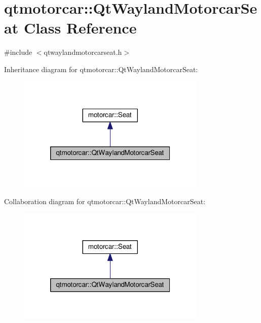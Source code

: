 \hypertarget{classqtmotorcar_1_1QtWaylandMotorcarSeat}{\section{qtmotorcar\-:\-:Qt\-Wayland\-Motorcar\-Seat Class Reference}
\label{classqtmotorcar_1_1QtWaylandMotorcarSeat}
}


{\ttfamily \#include $<$qtwaylandmotorcarseat.\-h$>$}



Inheritance diagram for qtmotorcar\-:\-:Qt\-Wayland\-Motorcar\-Seat\-:
\nopagebreak
\begin{figure}[H]
\begin{center}
\leavevmode
\includegraphics[width=254pt]{classqtmotorcar_1_1QtWaylandMotorcarSeat__inherit__graph}
\end{center}
\end{figure}


Collaboration diagram for qtmotorcar\-:\-:Qt\-Wayland\-Motorcar\-Seat\-:
\nopagebreak
\begin{figure}[H]
\begin{center}
\leavevmode
\includegraphics[width=254pt]{classqtmotorcar_1_1QtWaylandMotorcarSeat__coll__graph}
\end{center}
\end{figure}
